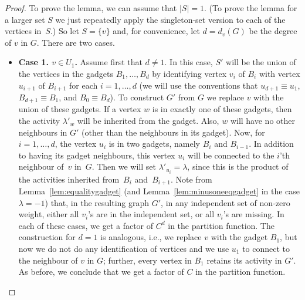 \documentclass[11pt]{article}
\begin{document}
\begin{proof}
To prove the lemma, we can assume that $|S|=1$.
(To prove the lemma for a larger set $S$ we just repeatedly apply the 
singleton-set version to each of the vertices in~$S$.)
So let $S = \{v\}$ and, for convenience, let $d=d_v(G)$ be the degree of $v$ in $G$. There are two cases.
 
\begin{itemize}
\item {\bf Case 1. $v\in U_1$.} Assume first that $d\neq 1$. In this case, $S'$ will be the union of the vertices in the gadgets $B_1,\ldots,B_{d}$ by identifying vertex $v_i$ of $B_i$ with vertex $u_{i+1}$ of $B_{i+1}$ for each $i=1,\hdots, d$ (we will use the conventions that $u_{d+1}\equiv u_1$, $B_{d+1}\equiv B_1$, and  $B_{0}\equiv B_d$).
To construct $G'$ from $G$ we  
replace $v$ with the union of
 these gadgets.
If a vertex $w$ is in exactly one of these gadgets, then the activity $\lambda'_w$ will be inherited from the gadget. Also, $w$ will have no other neighbours in $G'$ (other than the neighbours in its gadget).
Now, for $i=1,\hdots,d$, the vertex $u_i$ is in two gadgets, namely $B_{i}$ and $B_{i-1}$.
In addition to having its gadget neighbours, this vertex $u_i$ will be connected to the $i$'th neighbour of~$v$ in~$G$.
Then we will  set $\lambda'_{u_i} = \lambda$, since this is the product of the activities inherited from~$B_{i}$ and~$B_{i+1}$.
Note from Lemma~\ref{lem:equalitygadget} (and Lemma~\ref{lem:minusoneeqgadget} in the case $\lambda=-1$) that, in the resulting graph $G'$, in any
independent set of non-zero weight, either  
all $v_i$'s are in the independent set, or all $v_i$'s are missing. 
In each of these cases, we get a factor of $C^{d}$ in the partition function. The construction for $d=1$ is analogous, i.e., we replace $v$ with the gadget $B_1$, but now we do not do any identification of vertices and we use $u_1$ to connect to the neighbour of $v$ in $G$; further, every vertex in $B_1$ retains its activity in $G'$. As before, we conclude that we get a factor of $C$ in the partition function.


\end{itemize}
\end{proof}
\end{document}
